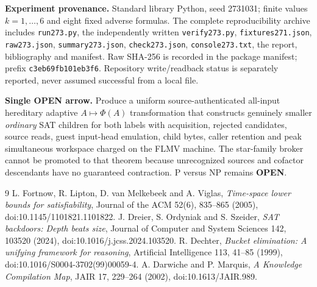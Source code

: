 \documentclass[11pt]{article}
\begin{document}
\textbf{Experiment provenance.} Standard library Python, seed 2731031; finite values $k=1,\ldots,6$ and eight fixed adverse formulas. The complete reproducibility archive includes \texttt{run273.py}, the independently written \texttt{verify273.py}, \texttt{fixtures271.json}, \texttt{raw273.json}, \texttt{summary273.json}, \texttt{check273.json}, \texttt{console273.txt}, the report, bibliography and manifest. Raw SHA-256 is recorded in the package manifest; prefix \texttt{c3eb69fb101eb3f6}. Repository write/readback status is separately reported, never assumed successful from a local file.

\textbf{Single OPEN arrow.} Produce a uniform source-authenticated all-input hereditary adaptive $A\mapsto\Phi(A)$ transformation that constructs genuinely smaller \emph{ordinary} SAT children for both labels with acquisition, rejected candidates, source reads, guest input-head emulation, child bytes, caller retention and peak simultaneous workspace charged on the FLMV machine. The star-family broker cannot be promoted to that theorem because unrecognized sources and cofactor descendants have no guaranteed contraction. P versus NP remains \textbf{OPEN}.

\begin{thebibliography}{9}
 L. Fortnow, R. Lipton, D. van Melkebeek and A. Viglas, \emph{Time-space lower bounds for satisfiability}, Journal of the ACM 52(6), 835--865 (2005), doi:10.1145/1101821.1101822.
 J. Dreier, S. Ordyniak and S. Szeider, \emph{SAT backdoors: Depth beats size}, Journal of Computer and System Sciences 142, 103520 (2024), doi:10.1016/j.jcss.2024.103520.
 R. Dechter, \emph{Bucket elimination: A unifying framework for reasoning}, Artificial Intelligence 113, 41--85 (1999), doi:10.1016/S0004-3702(99)00059-4.
 A. Darwiche and P. Marquis, \emph{A Knowledge Compilation Map}, JAIR 17, 229--264 (2002), doi:10.1613/JAIR.989.
\end{thebibliography}
\end{document}
